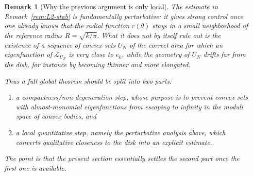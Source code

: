 \documentclass[a4paper,11pt,reqno]{amsart}
\newtheorem{remark}{Remark}[section]
\begin{document}
\begin{remark}[Why the previous argument is only local]
The estimate in Remark~\ref{rem:L2-stab} is fundamentally perturbative: it gives
strong control once one already knows that the radial function $r(\theta)$ stays
in a small neighborhood of the reference radius $R=\sqrt{k/\pi}$. What it does
\emph{not} by itself rule out is the existence of a sequence of convex sets
$U_N$ of the correct area for which an eigenfunction of $\mathcal L_{U_N}$ is
very close to $e_k$, while the geometry of $U_N$ drifts far from the disk, for
instance by becoming thinner and more elongated.

Thus a full global theorem should be split into two parts:
\begin{enumerate}
\item a \emph{compactness/non-degeneration step}, whose purpose is to prevent
convex sets with almost-monomial eigenfunctions from escaping to infinity in the
moduli space of convex bodies, and
\item a \emph{local quantitative step}, namely the perturbative analysis above,
which converts qualitative closeness to the disk into an explicit estimate.
\end{enumerate}
The point is that the present section essentially settles the second part once
the first one is available.
\end{remark}
\end{document}

